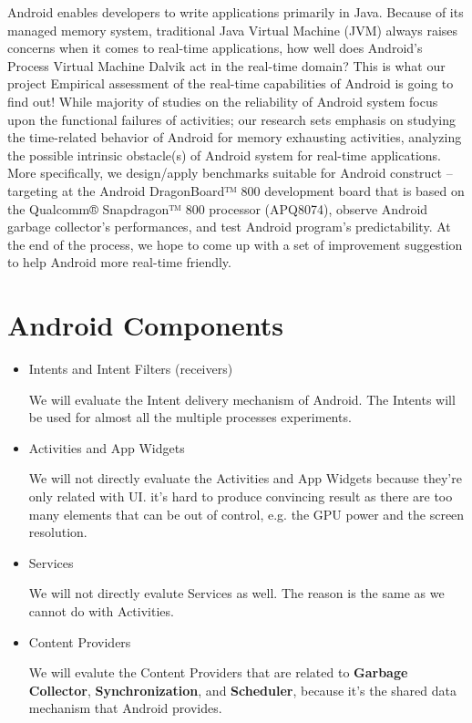 \documentclass[11pt]{article}
\begin{document}
Android enables developers to write applications primarily in Java.  Because of its managed memory system, traditional Java Virtual Machine (JVM) always raises concerns when it comes to real-time applications, how well does Android’s Process Virtual Machine Dalvik act in the real-time domain? This is what our project Empirical assessment of the real-time capabilities of Android is going to find out! While majority of studies on the reliability of Android system focus upon the functional failures of activities; our research sets emphasis on studying the time-related behavior of Android for memory exhausting activities, analyzing the possible intrinsic obstacle(s) of Android system for real-time applications. More specifically, we design/apply benchmarks suitable for Android construct -- targeting at  the Android DragonBoard™ 800 development board that is based on the Qualcomm® Snapdragon™ 800 processor (APQ8074), observe Android garbage collector’s performances, and test Android program’s predictability. At the end of the process, we hope to come up with a set of improvement suggestion to help Android more real-time friendly.

\section{Android Components}
\label{sec-2}
\begin{itemize}
\item Intents and Intent Filters (receivers)

We will evaluate the Intent delivery mechanism of Android.
The Intents will be used for almost all the multiple processes experiments.

\item Activities and App Widgets

We will not directly evaluate the Activities and App Widgets because they're only related with UI.
it's hard to produce convincing result as there are too many elements that can be out of control,
e.g. the GPU power and the screen resolution.

\item Services

We will not directly evalute Services as well. The reason is the same as we cannot do with Activities.

\item Content Providers

We will evalute the Content Providers that are related to \textbf{Garbage Collector}, \textbf{Synchronization},
and \textbf{Scheduler}, because it's the shared data mechanism that Android provides.
\end{itemize}
\end{document}
